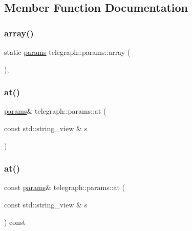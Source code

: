\subsection{Member Function Documentation}
\mbox{\label{classtelegraph_1_1params_a349fa6f58000ece5ee504bd0d59b5f6e}} 
\subsubsection{\texorpdfstring{array()}{array()}}
{\footnotesize\ttfamily static \hyperlink{classtelegraph_1_1params}{params} telegraph\+::params\+::array (\begin{DoxyParamCaption}{ }\end{DoxyParamCaption})\hspace{0.3cm}{\ttfamily [inline]}, {\ttfamily [static]}}

\mbox{\label{classtelegraph_1_1params_a86e283121acc4db6118b63e6df0fafcc}} 
\subsubsection{\texorpdfstring{at()}{at()}\hspace{0.1cm}{\footnotesize\ttfamily [1/2]}}
{\footnotesize\ttfamily \hyperlink{classtelegraph_1_1params}{params}\& telegraph\+::params\+::at (\begin{DoxyParamCaption}\item[{const std\+::string\+\_\+view \&}]{s }\end{DoxyParamCaption})\hspace{0.3cm}{\ttfamily [inline]}}

\mbox{\label{classtelegraph_1_1params_a85a5101497671f6b85ceeeca666cae81}} 
\subsubsection{\texorpdfstring{at()}{at()}\hspace{0.1cm}{\footnotesize\ttfamily [2/2]}}
{\footnotesize\ttfamily const \hyperlink{classtelegraph_1_1params}{params}\& telegraph\+::params\+::at (\begin{DoxyParamCaption}\item[{const std\+::string\+\_\+view \&}]{s }\end{DoxyParamCaption}) const\hspace{0.3cm}{\ttfamily [inline]}}

